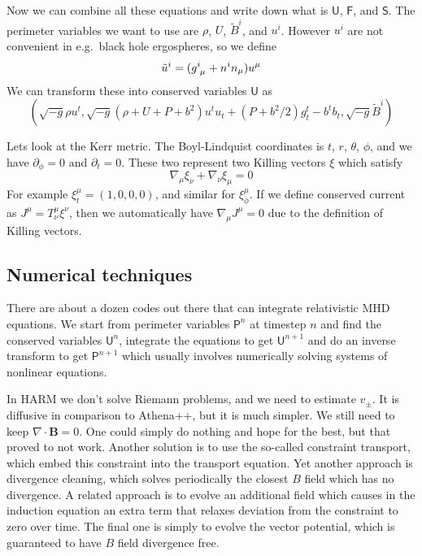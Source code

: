\documentclass[letterpaper, 11pt]{article}
\numberwithin{equation}{section}
\numberwithin{figure}{section}
\begin{document}
Now we can combine all these equations and write down what is $\mathsf{U}$,
$\mathsf{F}$, and $\mathsf{S}$. The perimeter variables we want to use are
$\rho$, $U$, $\tilde{B}^i$, and $u^i$. However $u^i$ are not convenient in e.g.\
black hole ergospheres, so we define
\begin{equation}
  \label{eq:34}
  \tilde{u}^i = (\tensor{g}{^i_{\mu}} + n^in_{\mu})u^{\mu}
\end{equation}
We can transform these into conserved variables $\mathsf{U}$ as
\begin{equation}
  \label{eq:35}
  \left( \sqrt{-g}\rho u^t, \sqrt{-g}(\rho + U + P + b^2)u^tu_t + (P + b^2/2)g^t_t - b^tb_t, \sqrt{-g}\tilde{B}^{i} \right)
\end{equation}

Lets look at the Kerr metric. The Boyl-Lindquist coordinates is $t$, $r$,
$\theta$, $\phi$, and we have $\partial_{\phi} = 0$ and $\partial_t = 0$. These
two represent two Killing vectors $\xi$ which satisfy
\begin{equation}
  \label{eq:36}
  \nabla_{\mu}\xi_{\nu} + \nabla_{\nu}\xi_{\mu} = 0
\end{equation}
For example $\xi_t^{\mu} = (1, 0, 0, 0)$, and similar for $\xi_{\phi}^{\mu}$. If
we define conserved current as $J^{\mu} = T^{\mu}_{\nu}\xi^{\nu}$, then we
automatically have $\nabla_{\mu}J^{\mu} = 0$ due to the definition of Killing
vectors.

\subsection{Numerical techniques}

There are about a dozen codes out there that can integrate relativistic MHD
equations. We start from perimeter variables $\mathsf{P}^n$ at timestep $n$ and
find the conserved variables $\mathsf{U}^n$, integrate the equations to get
$\mathsf{U}^{n+1}$ and do an inverse transform to get $\mathsf{P}^{n+1}$ which
usually involves numerically solving systems of nonlinear equations.

In HARM we don't solve Riemann problems, and we need to estimate $v_{\pm}$. It
is diffusive in comparison to Athena++, but it is much simpler. We still need to
keep $\nabla\cdot \mathbf{B} = 0$. One could simply do nothing and hope for the
best, but that proved to not work. Another solution is to use the so-called
constraint transport, which embed this constraint into the transport equation.
Yet another approach is divergence cleaning, which solves periodically the
closest $B$ field which has no divergence. A related approach is to evolve an
additional field which causes in the induction equation an extra term that
relaxes deviation from the constraint to zero over time. The final one is simply
to evolve the vector potential, which is guaranteed to have $B$ field divergence
free.
\end{document}
